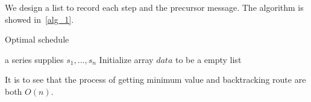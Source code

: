 We design a list to record each step and the precursor message. The algorithm is showed in~\ref{alg_1}.

\begin{algorithm}
\caption{Optimal schedule}
\label{alg_1}
\begin{algorithmic}[1]
\REQUIRE a series supplies $s_1,...,s_n$
\STATE Initialize array $data$ to be a empty list
        \ELSE
        \ENDIF
    \ELSE
        \ELSE
        \ENDIF
    \ENDIF
\ENDFOR
{}
    \ELSE
    \ENDIF
\ENDWHILE
{}

\end{algorithmic}
\end{algorithm}

It is to see that the process of getting minimum value and backtracking route are both $O(n)$.

